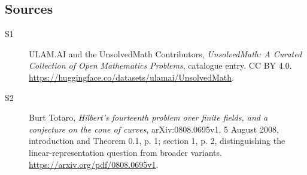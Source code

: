 \documentclass[11pt]{article}
\begin{document}
\subsection{Sources}
\begin{description}
\item[\hypertarget{source:statement:1}{S1}] ULAM.AI and the UnsolvedMath Contributors, \emph{UnsolvedMath: A Curated Collection of Open Mathematics Problems}, catalogue entry. CC BY 4.0. \url{https://huggingface.co/datasets/ulamai/UnsolvedMath}.
\item[\hypertarget{source:statement:2}{S2}] Burt Totaro, \emph{Hilbert's fourteenth problem over finite fields, and a conjecture on the cone of curves}, arXiv:0808.0695v1, 5 August 2008, introduction and Theorem 0.1, p. 1; section 1, p. 2, distinguishing the linear-representation question from broader variants. \url{https://arxiv.org/pdf/0808.0695v1}.
\end{description}
\label{end:statement}
\end{document}
